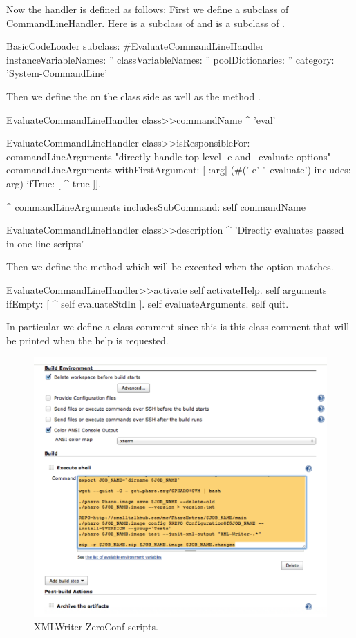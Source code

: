 \documentclass[a4paper,10pt,twoside]{book}
\begin{document}
Now the handler is defined as follows: First we define a subclass of CommandLineHandler. Here 
 is a subclass of  and  is a subclass of .

\begin{code}{}
BasicCodeLoader subclass: #EvaluateCommandLineHandler
	instanceVariableNames: ''
	classVariableNames: ''
	poolDictionaries: ''
	category: 'System-CommandLine'
\end{code}

Then we define the  on the class side as well as the method .

\begin{code}{}
EvaluateCommandLineHandler class>>commandName
	^ 'eval'

EvaluateCommandLineHandler class>>isResponsibleFor: commandLineArguments
	"directly handle top-level -e and --evaluate options"
	commandLineArguments withFirstArgument: [ :arg| 
		(#('-e' '--evaluate') includes: arg)
			ifTrue: [ ^ true ]].
	
	^ commandLineArguments includesSubCommand: self commandName

EvaluateCommandLineHandler class>>description
	^ 'Directly evaluates passed in one line scripts'
\end{code}

Then we define the method  which will be executed when the option matches. 
\begin{code}{}
EvaluateCommandLineHandler>>activate
	self activateHelp.
	self arguments ifEmpty: [ ^ self evaluateStdIn ].
	self evaluateArguments.
	self quit.
\end{code}

In particular we define a class comment since this is this class comment that will be printed when the help is requested. 

\begin{figure}[!h]
	\centering
	\includegraphics[width=\textwidth]{Jenkins}
	\caption{XMLWriter ZeroConf scripts. \label{fig:jenkins}}
\end{figure}
\end{document}
